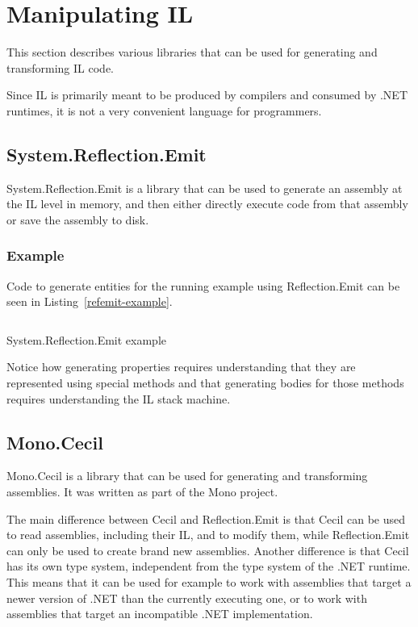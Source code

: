 \section{Manipulating \acs{IL}}

This section describes various libraries that can be used for generating and transforming \ac{IL} code.

Since \ac{IL} is primarily meant to be produced by compilers and consumed by .NET runtimes, it is not a very convenient language for programmers.

\subsection{System.Reflection.Emit}

System.Reflection.Emit \cite{refemit} is a library that can be used to generate an assembly at the \ac{IL} level in memory, and then either directly execute code from that assembly or save the assembly to disk.

\subsubsection{Example}

Code to generate entities for the running example using Reflection.Emit can be seen in Listing~\ref{refemit-example}.

\begin{listing}
\inputminted[firstline=12,lastline=64]{csharp}{samples/ReflectionEmit/Program.cs}
\caption{System.Reflection.Emit example}
\label{refemit-example}
\end{listing}

Notice how generating properties requires understanding that they are represented using special methods and that generating bodies for those methods requires understanding the \ac{IL} stack machine.

\subsection{Mono.Cecil}

Mono.Cecil \cite{cecil} is a library that can be used for generating and transforming assemblies. It was written as part of the Mono project.

The main difference between Cecil and Reflection.Emit is that Cecil can be used to read assemblies, including their \ac{IL}, and to modify them, while Reflection.Emit can only be used to create brand new assemblies. Another difference is that Cecil has its own type system, independent from the type system of the .NET runtime. This means that it can be used for example to work with assemblies that target a newer version of .NET than the currently executing one, or to work with assemblies that target an incompatible .NET implementation.

